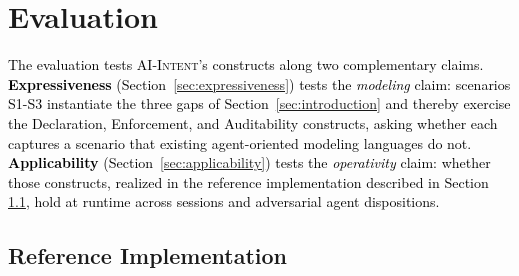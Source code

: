 \documentclass[runningheads]{llncs}
\begin{document}
\section{Evaluation}
\label{sec:evaluation}


\textcolor{black}{The evaluation tests \textsc{AI-Intent}'s constructs along two complementary claims. \textbf{Expressiveness} (Section~\ref{sec:expressiveness}) tests the \emph{modeling} claim: scenarios S1-S3 instantiate the three gaps of Section~\ref{sec:introduction} and thereby exercise the Declaration,  Enforcement, and Auditability constructs, asking whether each captures a scenario that existing agent-oriented modeling languages do not. \textbf{Applicability} (Section~\ref{sec:applicability}) tests the \emph{operativity} claim: whether those constructs, realized in the reference implementation described in Section \ref{sec:implementation},  hold at runtime across sessions and adversarial agent dispositions.} 

\subsection{Reference Implementation}
\label{sec:implementation}
\end{document}

